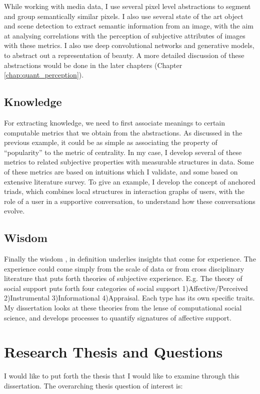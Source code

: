 While working with media data, I use several pixel level abstractions to segment and group semantically similar pixels. I also use several state of the art object and scene detection to extract semantic information from an image, with the aim at analysing correlations with the perception of subjective attributes of images with these metrics. I also use deep convolutional networks and generative models, to abstract out a representation of beauty. A more detailed discussion of these abstractions would be done in the later chapters (Chapter \ref{chap:quant_perception}).  

\subsection{Knowledge}
For extracting knowledge, we need to first associate meanings to certain computable metrics that we obtain from the abstractions. As discussed in the previous example, it could be as simple as associating the property of ``popularity'' to the metric of centrality. In my case, I develop several of these metrics to related subjective properties with measurable structures in data. Some of these metrics are based on intuitions which I validate, and some based on extensive literature survey. To give an example, I develop the concept of anchored triads, which combines local structures in interaction graphs of users, with the role of a user in a supportive conversation, to understand how these conversations evolve.

\subsection{Wisdom}
Finally the wisdom , in definition underlies insights that come for experience. The experience could come simply from the scale of data or from cross disciplinary literature that puts forth theories of subjective experience. E.g. The theory of social support puts forth four categories of social support 1)Affective/Perceived 2)Instrumental 3)Informational 4)Appraisal. Each type has its own specific traits. My dissertation looks at these theories from the lense of computational social science, and develops processes to quantify signatures of affective support.

\section{Research Thesis and Questions}
I would like to put forth the thesis that I would like to examine through this dissertation. The overarching thesis question of interest is: 

